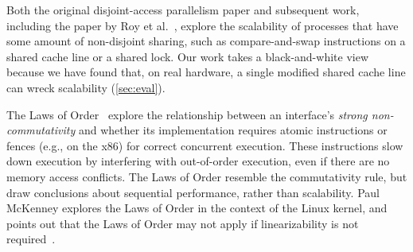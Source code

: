 


Both the original disjoint-access parallelism paper and subsequent work,
including the paper by Roy et al.~\cite{roy:limits-dap}, explore the scalability
of processes that have some amount of non-disjoint sharing, such as
compare-and-swap instructions on a shared cache line or a shared lock.
Our work takes a black-and-white view because we have found that, on real
hardware, a single modified
shared cache line can wreck
scalability (\cref{sec:eval}).

The Laws of Order~\cite{law:orders} explore the relationship between an
interface's \emph{strong non-commutativity} and whether its implementation
requires atomic instructions or fences (e.g.,  on the x86) for
correct concurrent execution.  These instructions slow down execution by
interfering with out-of-order execution, even if there are no memory access
conflicts.  The Laws of Order resemble the commutativity rule, but draw
conclusions about sequential performance, rather than scalability.
%
Paul McKenney
explores the Laws of Order in the context of the Linux kernel, and points out
that the Laws of Order may not apply if linearizability is not
required~\cite{lwn:law}.


